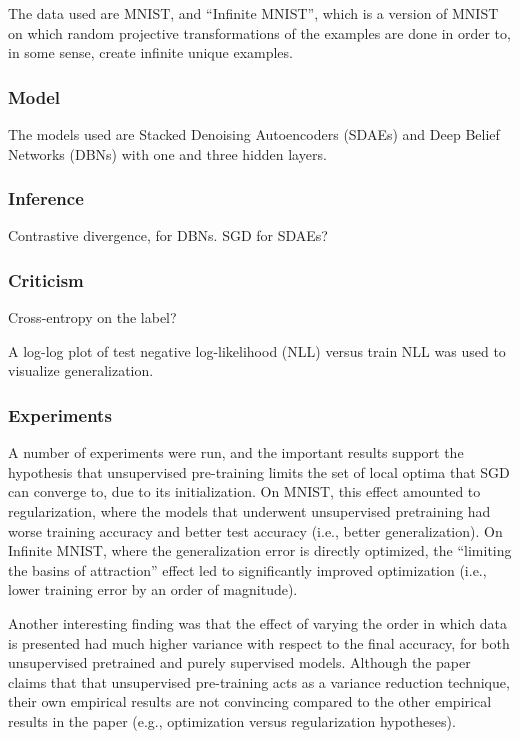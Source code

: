\documentclass[a4paper, 12pt]{article}
\begin{document}
The data used are MNIST, and ``Infinite MNIST'', which is a version of MNIST on
which random projective transformations of the examples are done in order to,
in some sense, create infinite unique examples.


\subsubsection{Model}

The models used are Stacked Denoising Autoencoders (SDAEs) and Deep Belief
Networks (DBNs) with one and three hidden layers.


\subsubsection{Inference}

Contrastive divergence, for DBNs. SGD for SDAEs?


\subsubsection{Criticism}

Cross-entropy on the label?

A log-log plot of test negative log-likelihood (NLL) versus train NLL was used
to visualize generalization.


\subsubsection{Experiments}

A number of experiments were run, and the important results support the
hypothesis that unsupervised pre-training limits the set of local optima that
SGD can converge to, due to its initialization. On MNIST, this effect amounted
to regularization, where the models that underwent unsupervised pretraining had
worse training accuracy and better test accuracy (i.e., better generalization).
On Infinite MNIST, where the generalization error is directly optimized, the
``limiting the basins of attraction'' effect led to significantly improved
optimization (i.e., lower training error by an order of magnitude).

Another interesting finding was that the effect of varying the order in which
data is presented had much higher variance with respect to the final accuracy,
for both unsupervised pretrained and purely supervised models. Although the
paper claims that that unsupervised pre-training acts as a variance reduction
technique, their own empirical results are not convincing compared to the other
empirical results in the paper (e.g., optimization versus regularization
hypotheses).
\end{document}
